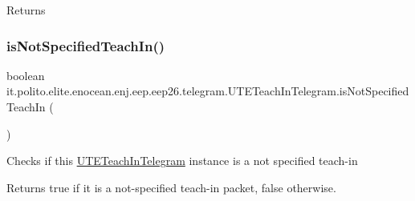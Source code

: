 \begin{DoxyReturn}{Returns}

\end{DoxyReturn}
\hypertarget{classit_1_1polito_1_1elite_1_1enocean_1_1enj_1_1eep_1_1eep26_1_1telegram_1_1_u_t_e_teach_in_telegram_ab13ee92a1d1b1543eb36c3339feb60ea}{}\label{classit_1_1polito_1_1elite_1_1enocean_1_1enj_1_1eep_1_1eep26_1_1telegram_1_1_u_t_e_teach_in_telegram_ab13ee92a1d1b1543eb36c3339feb60ea} 
\subsubsection{\texorpdfstring{is\+Not\+Specified\+Teach\+In()}{isNotSpecifiedTeachIn()}}
{\footnotesize\ttfamily boolean it.\+polito.\+elite.\+enocean.\+enj.\+eep.\+eep26.\+telegram.\+U\+T\+E\+Teach\+In\+Telegram.\+is\+Not\+Specified\+Teach\+In (\begin{DoxyParamCaption}{ }\end{DoxyParamCaption})}

Checks if this \hyperlink{classit_1_1polito_1_1elite_1_1enocean_1_1enj_1_1eep_1_1eep26_1_1telegram_1_1_u_t_e_teach_in_telegram}{U\+T\+E\+Teach\+In\+Telegram} instance is a not specified teach-\/in

\begin{DoxyReturn}{Returns}
true if it is a not-\/specified teach-\/in packet, false otherwise. 
\end{DoxyReturn}
\hypertarget{classit_1_1polito_1_1elite_1_1enocean_1_1enj_1_1eep_1_1eep26_1_1telegram_1_1_u_t_e_teach_in_telegram_a4ca2569efed0e5dedf87f352edd87d64}{}\label{classit_1_1polito_1_1elite_1_1enocean_1_1enj_1_1eep_1_1eep26_1_1telegram_1_1_u_t_e_teach_in_telegram_a4ca2569efed0e5dedf87f352edd87d64} 
